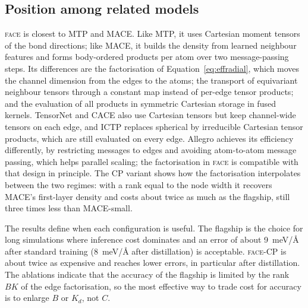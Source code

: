 \documentclass[journal=jctcce,manuscript=article,layout=traditional]{achemso}
\newcommand{\FACE}{\textup{\textsc{face}}}
\begin{document}
\subsection{Position among related models}
\FACE{} is closest to MTP and MACE. Like MTP, it uses Cartesian moment tensors of the bond directions; like MACE, it
builds the density from learned neighbour features and forms body-ordered products per atom over two
message-passing steps. Its differences are the factorisation of Equation~\ref{eq:effradial}, which moves the channel
dimension from the edges to the atoms; the transport of equivariant neighbour tensors through a constant map instead
of per-edge tensor products; and the evaluation of all products in symmetric Cartesian storage in fused kernels.
TensorNet and CACE also use Cartesian tensors but keep channel-wide tensors on each edge, and ICTP replaces
spherical by irreducible Cartesian tensor products, which are still evaluated on every edge. Allegro achieves its efficiency differently, by
restricting messages to edges and avoiding atom-to-atom message passing, which helps parallel scaling; the
factorisation in \FACE{} is compatible with that design in principle. The CP variant shows how the factorisation
interpolates between the two regimes: with a rank equal to the node width it recovers MACE's first-layer
density and costs about twice as much as the flagship, still three times less than MACE-small.

The results define when each configuration is useful. The flagship is the choice for long simulations where
inference cost dominates and an error of about 9~meV/\AA{} after standard training (8~meV/\AA{} after
distillation) is acceptable. \FACE-CP is about twice as expensive and reaches lower errors, in particular after
distillation. The ablations indicate that the accuracy of the flagship is limited by the rank $BK$ of the edge
factorisation, so the most effective way to trade cost for accuracy is to enlarge $B$ or $K_d$, not $C$.
\end{document}
